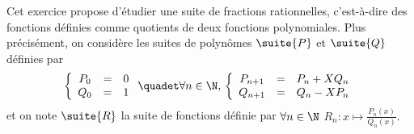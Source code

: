 


\begin{exercice}
Cet exercice propose d'étudier une suite de fractions rationnelles, c'est-à-dire des fonctions définies comme quotients de deux fonctions polynomiales. Plus précisément, on considère les suites de polynômes $\suite{P}$ et $\suite{Q}$ définies par 
$$
\left\{\begin{array}{ccc}
P_0 &=& 0\\
Q_0 &=& 1
\end{array}
 \right. \quadet \forall n\in \N, \, 
\left\{\begin{array}{ccc}
P_{n+1} &=& P_n + X Q_n\\
Q_{n+1} &=& Q_n -XP_n
\end{array}
 \right. 
$$
et on note $\suite{R}$ la suite de fonctions définie par $\forall n\in \N$ 
$R_n : x\mapsto\frac{P_n(x)}{Q_n(x)}.$


\end{exercice}
